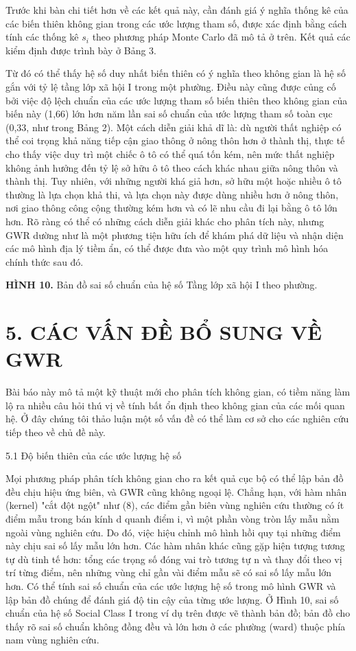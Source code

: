 Trước khi bàn chi tiết hơn về các kết quả này, cần đánh giá ý nghĩa thống kê của các biến thiên không gian trong các ước lượng tham số, được xác định bằng cách tính các thống kê \(s_i\) theo phương pháp Monte Carlo đã mô tả ở trên. Kết quả các kiểm định được trình bày ở Bảng 3.

Từ đó có thể thấy hệ số duy nhất biến thiên có ý nghĩa theo không gian là hệ số gắn với tỷ lệ tầng lớp xã hội I trong một phường. Điều này cũng được củng cố bởi việc độ lệch chuẩn của các ước lượng tham số biến thiên theo không gian của biến này (1,66) lớn hơn năm lần sai số chuẩn của ước lượng tham số toàn cục (0,33, như trong Bảng 2). Một cách diễn giải khả dĩ là: dù người thất nghiệp có thể coi trọng khả năng tiếp cận giao thông ở nông thôn hơn ở thành thị, thực tế cho thấy việc duy trì một chiếc ô tô có thể quá tốn kém, nên mức thất nghiệp không ảnh hưởng đến tỷ lệ sở hữu ô tô theo cách khác nhau giữa nông thôn và thành thị. Tuy nhiên, với những người khá giả hơn, sở hữu một hoặc nhiều ô tô thường là lựa chọn khả thi, và lựa chọn này được dùng nhiều hơn ở nông thôn, nơi giao thông công cộng thường kém hơn và có lẽ nhu cầu đi lại bằng ô tô lớn hơn. Rõ ràng có thể có những cách diễn giải khác cho phân tích này, nhưng GWR dường như là một phương tiện hữu ích để khám phá dữ liệu và nhận diện các mô hình địa lý tiềm ẩn, có thể được đưa vào một quy trình mô hình hóa chính thức sau đó.

\textbf{HÌNH 10.} Bản đồ sai số chuẩn của hệ số Tầng lớp xã hội I theo phường.

\section{5. CÁC VẤN ĐỀ BỔ SUNG VỀ GWR}

Bài báo này mô tả một kỹ thuật mới cho phân tích không gian, có tiềm năng làm lộ ra nhiều câu hỏi thú vị về tính bất ổn định theo không gian của các mối quan hệ. Ở đây chúng tôi thảo luận một số vấn đề có thể làm cơ sở cho các nghiên cứu tiếp theo về chủ đề này.

5.1 Độ biến thiên của các ước lượng hệ số

Mọi phương pháp phân tích không gian cho ra kết quả cục bộ có thể lập bản đồ đều chịu hiệu ứng biên, và GWR cũng không ngoại lệ. Chẳng hạn, với hàm nhân (kernel) "cắt đột ngột" như (8), các điểm gần biên vùng nghiên cứu thường có ít điểm mẫu trong bán kính d quanh điểm i, vì một phần vòng tròn lấy mẫu nằm ngoài vùng nghiên cứu. Do đó, việc hiệu chỉnh mô hình hồi quy tại những điểm này chịu sai số lấy mẫu lớn hơn. Các hàm nhân khác cũng gặp hiện tượng tương tự dù tinh tế hơn: tổng các trọng số đóng vai trò tương tự n và thay đổi theo vị trí từng điểm, nên những vùng chỉ gần vài điểm mẫu sẽ có sai số lấy mẫu lớn hơn. Có thể tính sai số chuẩn của các ước lượng hệ số trong mô hình GWR và lập bản đồ chúng để đánh giá độ tin cậy của từng ước lượng. Ở Hình 10, sai số chuẩn của hệ số Social Class I trong ví dụ trên được vẽ thành bản đồ; bản đồ cho thấy rõ sai số chuẩn không đồng đều và lớn hơn ở các phường (ward) thuộc phía nam vùng nghiên cứu.


